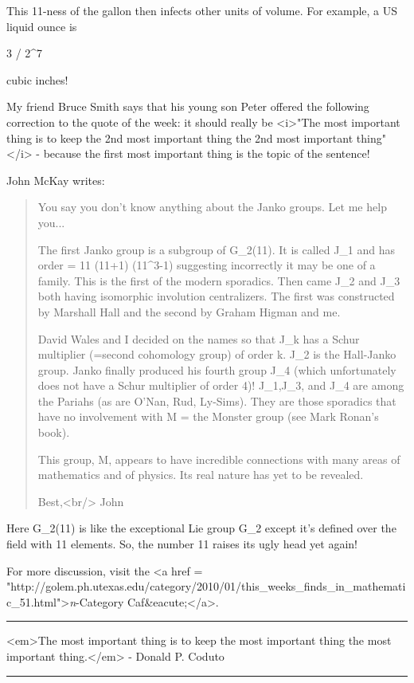 This 11-ness of the gallon then infects other units of volume.
For example, a US liquid ounce is 

3   / 2^{7}

cubic inches!  

My friend Bruce Smith says that his young son Peter offered the
following correction to the quote of the week: it should really be
<i>"The most important thing is to keep the 2nd most important
thing the 2nd most important thing"</i> - because the first most
important thing is the topic of the sentence!

John McKay writes:

\begin{quote}

   You say you don't know anything about the Janko groups. Let me 
   help you...

   The first Janko group is a subgroup of G_{2}(11). It is
   called J_{1} and has order = 11 \times  (11+1) \times 
   (11^{3}-1) suggesting incorrectly it may be one of a
   family.  This is the first of the modern sporadics. Then came
   J_{2} and J_{3} both having isomorphic involution
   centralizers. The first was constructed by Marshall Hall and the
   second by Graham Higman and me.

   David Wales and I decided on the names so that J_{k} has a
   Schur multiplier (=second cohomology group) of order k.
   J_{2} is the Hall-Janko group.  Janko finally produced his
   fourth group J_{4} (which unfortunately does not have a
   Schur multiplier of order 4)!  J_{1},J_{3}, and
   J_{4} are among the Pariahs (as are O'Nan, Rud, Ly-Sims).
   They are those sporadics that have no involvement with M = the
   Monster group (see Mark Ronan's book).

   This group, M, appears to have incredible connections with many
   areas of mathematics and of physics. Its real nature has yet to be
   revealed.

   Best,<br/>
   John
\end{quote}

Here G_{2}(11) is like the exceptional Lie group G_{2}
except it's defined over the field with 11 elements.  So, the number
11 raises its ugly head yet again!

For more discussion, visit the <a href = "http://golem.ph.utexas.edu/category/2010/01/this_weeks_finds_in_mathematic_51.html">\emph{n}-Category Caf&eacute;</a>.

\par\noindent\rule{\textwidth}{0.4pt}
<em>The most important thing is to keep the most important thing the most
important thing.</em> - Donald P. Coduto

\par\noindent\rule{\textwidth}{0.4pt}

